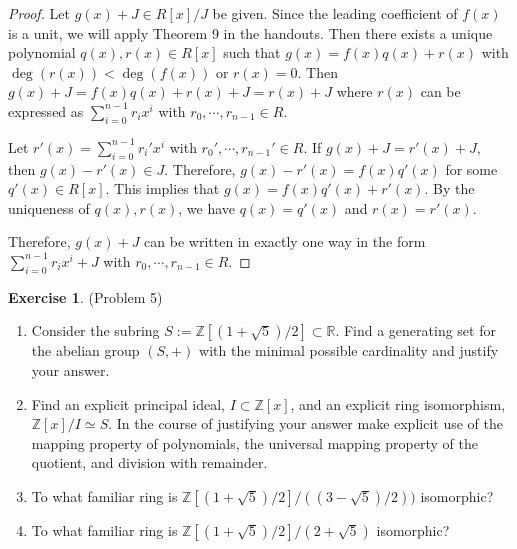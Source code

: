 \documentclass[12pt, psamsfonts]{amsart}
\theoremstyle{definition}
\newtheorem*{exer}{Exercise}
\theoremstyle{remark}
\numberwithin{equation}{section}
\begin{document}
\begin{proof}
  Let $g(x) + J \in R[x] / J$ be given.
  Since the leading coefficient of $f(x)$ is a unit, we will apply Theorem 9 in the handouts.
  Then there exists a unique polynomial $q(x), r(x) \in R[x]$ such that $g(x) = f(x)q(x) + r(x)$ with $\deg(r(x)) < \deg(f(x))$ or $r(x) = 0$.
  Then $g(x) + J = f(x)q(x) + r(x) + J = r(x) + J$ where $r(x)$ can be expressed as $\sum_{i = 0}^{n - 1} r_ix^i$ with $r_0, \cdots, r_{n - 1} \in R$.

  Let $r'(x) = \sum_{i = 0}^{n - 1} r_i'x^i$ with $r_0', \cdots, r_{n - 1}' \in R$.
  If $g(x) + J = r'(x) + J$, then $g(x) - r'(x) \in J$.
  Therefore, $g(x) - r'(x) = f(x)q'(x)$ for some $q'(x) \in R[x]$.
  This implies that $g(x) = f(x)q'(x) + r'(x)$.
  By the uniqueness of $q(x), r(x)$, we have $q(x) = q'(x)$ and $r(x) = r'(x)$.

  Therefore, $g(x) + J$ can be written in exactly one way in the form $\sum_{i = 0}^{n - 1} r_ix^i + J$ with $r_0, \cdots, r_{n - 1} \in R$.
\end{proof}

\begin{exer}{(Problem 5)}
  $ $
  \begin{enumerate}
    \item
      Consider the subring $S := \mathbb{Z}[(1 + \sqrt{5})/2] \subset \mathbb{R}$.
      Find a generating set for the abelian group $(S, +)$ with the minimal possible cardinality and justify your answer.
    \item
      Find an explicit principal ideal, $I \subset \mathbb{Z}[x]$, and an explicit ring isomorphism, $\mathbb{Z}[x]/I \simeq S$.
      In the course of justifying your answer make explicit use of the mapping property of polynomials, the universal mapping property of the quotient, and division with remainder.
    \item
      To what familiar ring is $\mathbb{Z}[(1 + \sqrt{5}) / 2] / ((3 - \sqrt{5}) / 2))$ isomorphic?
    \item
      To what familiar ring is $\mathbb{Z}[(1 + \sqrt{5}) / 2] / (2 + \sqrt{5})$ isomorphic?
  \end{enumerate}
\end{exer}
\end{document}
